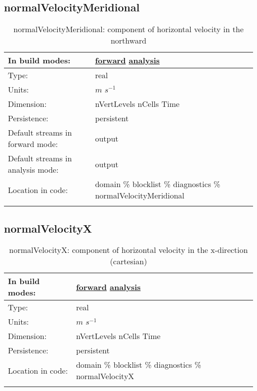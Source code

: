 \subsection[normalVelocityMeridional]{normalVelocityMeridional}
\label{subsec:var_sec_diagnostics_normalVelocityMeridional}
\begin{center}
\begin{longtable}{| p{2.0in} | p{4.0in} |}
        \hline 
        In build modes: & \hyperref[subsec:forward_var_tab_diagnostics]{forward} \hyperref[subsec:analysis_var_tab_diagnostics]{analysis} \\
        \hline 
        Type: & real \\
        \hline 
        Units: & $m$ $s^{-1}$ \\
        \hline 
        Dimension: & nVertLevels nCells Time \\
        \hline 
        Persistence: & persistent \\
        \hline 
		 Default streams in forward mode: &  output \\
        \hline 
		 Default streams in analysis mode: &  output \\
        \hline 
		 Location in code: & domain \% blocklist \% diagnostics \% normalVelocityMeridional \\
		 \hline 
    \caption{normalVelocityMeridional: component of horizontal velocity in the northward}
\end{longtable}
\end{center}
\subsection[normalVelocityX]{normalVelocityX}
\label{subsec:var_sec_diagnostics_normalVelocityX}
\begin{center}
\begin{longtable}{| p{2.0in} | p{4.0in} |}
        \hline 
        In build modes: & \hyperref[subsec:forward_var_tab_diagnostics]{forward} \hyperref[subsec:analysis_var_tab_diagnostics]{analysis} \\
        \hline 
        Type: & real \\
        \hline 
        Units: & $m$ $s^{-1}$ \\
        \hline 
        Dimension: & nVertLevels nCells Time \\
        \hline 
        Persistence: & persistent \\
        \hline 
		 Location in code: & domain \% blocklist \% diagnostics \% normalVelocityX \\
		 \hline 
    \caption{normalVelocityX: component of horizontal velocity in the x-direction (cartesian)}
\end{longtable}
\end{center}
